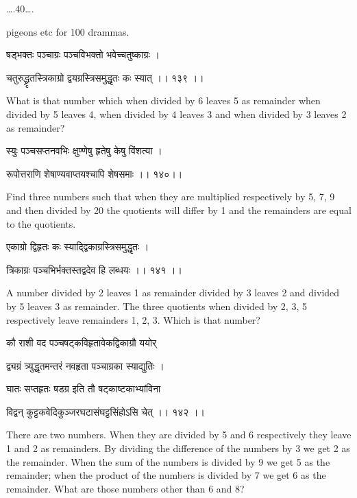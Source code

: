 \documentclass[]{article}
\date{}
\begin{document}
{\ldots{}.40\ldots{}.}

{pigeons etc for 100 drammas.}

{षड्भक्तः पञ्चाग्रः पञ्चविभक्तो भवेच्चतुष्काग्रः । }

{चतुरुद्ध्रृतस्त्रिकाग्रो द्वयग्रस्त्रिसमुद्धृतः कः स्यात् ।। १३९ ।। }

{What is that number which when divided by 6 leaves 5 as remainder when
divided by 5 leaves 4, when divided by 4 leaves 3 and when divided by 3
leaves 2 as remainder?}

{स्युः पञ्चसप्तनवभिः क्षुण्णेषु हृतेषु केषु विंशत्या । }

{रूपोत्तराणि शेषाण्यवाप्तयश्चापि शेषसमाः ।। १४०।। }

{Find three numbers such that when they are multiplied respectively by
5, 7, 9 and then divided by 20 the quotients will differ by 1 and the
remainders are equal to the quotients. }

{एकाग्रो द्विहृतः कः स्याद्द्विकाग्रस्त्रिसमुद्धृतः । }

{त्रिकाग्रः पञ्चभिर्भक्तस्तद्वदेव हि लब्धयः ।। १४१ ।। }

{A number divided by 2 leaves 1 as remainder divided by 3 leaves 2 and
divided by 5 leaves 3 as remainder. The three quotients when divided by
2, 3, 5 respectively leave remainders 1, 2, 3. Which is that number?}

{कौ राशी वद पञ्चषट्कविहृतावेकद्विकाग्रौ ययोर् }

{द्व्यग्रं त्र्युद्धृतमन्तरं नवहृता पञ्चाग्रका स्याद्युतिः । }

{घातः सप्तहृतः षडग्र इति तौ षट्काष्टकाभ्यांविना }

{विद्वन् कुट्टकवेदिकुञ्जरघटासंघट्टसिंहोऽसि चेत् ।। १४२ ।। }

{There are two numbers. When they are divided by 5 and 6 respectively
they leave 1 and 2 as remainders. By dividing the difference of the
numbers by 3 we get 2 as the remainder. When the sum of the numbers is
divided by 9 we get 5 as the remainder; when the product of the numbers
is divided by 7 we get 6 as the remainder. What are those numbers other
than 6 and 8?\\
}
\end{document}
